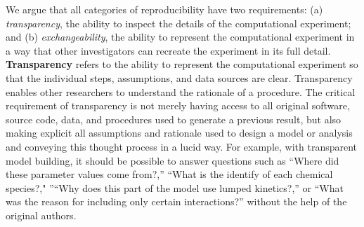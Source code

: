 \documentclass[10pt,letterpaper]{article}
\begin{document}
We argue that all categories of reproducibility have two requirements: (a) \textit{transparency}, the ability to inspect the details of the computational experiment; and (b) \textit{exchangeability}, the ability to represent the computational experiment in a way that other investigators can recreate the experiment in its full detail.
\textbf{Transparency} refers to the ability to represent the computational experiment so that the individual steps, assumptions, and data sources are clear. Transparency enables other researchers to understand the rationale of a procedure. The critical requirement of transparency is not merely having access to all original software, source code, data, and procedures used to generate a previous result, but also making explicit all assumptions and rationale used to design a model or analysis and conveying this thought process in a lucid way. For example, with transparent model building, it should be possible to answer questions such as ``Where did these parameter values come from?,''  ``What is the identify of each chemical species?," ''``Why does this part of the model use lumped kinetics?,'' or ``What was the reason for including only certain interactions?'' without the help of the original authors.
%
%
\end{document}
